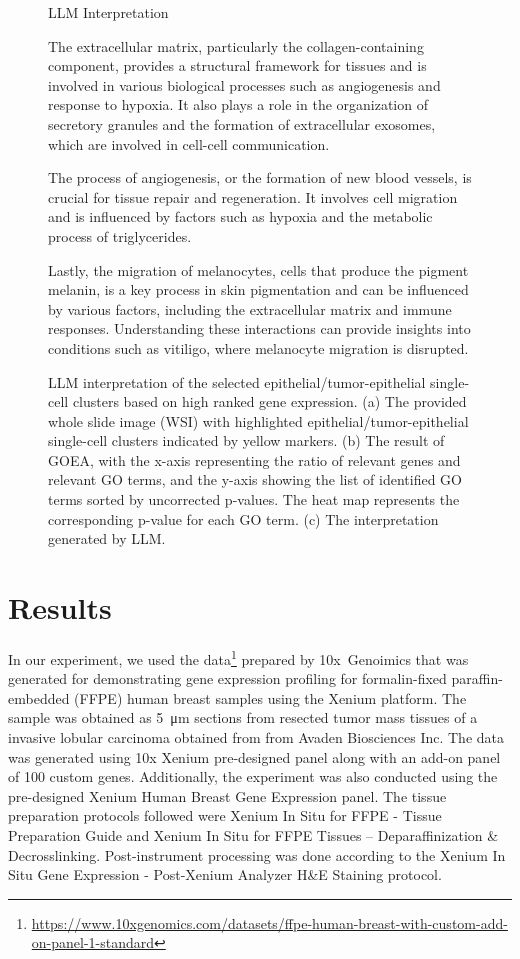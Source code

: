 \documentclass{article}
\begin{document}
\begin{figure}[t]
{\begin{llm}{LLM Interpretation}
{			\hspace{15pt} The extracellular matrix, particularly the collagen-containing component, provides a structural framework for tissues and is involved in various biological processes such as angiogenesis and response to hypoxia. It also plays a role in the organization of secretory granules and the formation of extracellular exosomes, which are involved in cell-cell communication. 
				
			\hspace{15pt} The process of angiogenesis, or the formation of new blood vessels, is crucial for tissue repair and regeneration. It involves cell migration and is influenced by factors such as hypoxia and the metabolic process of triglycerides. 
			
			\hspace{15pt} Lastly, the migration of melanocytes, cells that produce the pigment melanin, is a key process in skin pigmentation and can be influenced by various factors, including the extracellular matrix and immune responses. Understanding these interactions can provide insights into conditions such as vitiligo, where melanocyte migration is disrupted.}%
	\end{llm}}
	\caption{LLM interpretation of the selected epithelial/tumor-epithelial single-cell clusters based on high ranked gene expression. (a) The provided whole slide image (WSI) with highlighted epithelial/tumor-epithelial single-cell clusters indicated by yellow markers. (b) The result of GOEA, with the x-axis representing the ratio of relevant genes and relevant GO terms, and the y-axis showing the list of identified GO terms sorted by uncorrected p-values. The heat map represents the corresponding p-value for each GO term. (c) The interpretation generated by LLM.}
	\label{fig:result2}
\end{figure}

\section{Results}

In our experiment, we used the data\footnote{\url{https://www.10xgenomics.com/datasets/ffpe-human-breast-with-custom-add-on-panel-1-standard}} prepared by 10x~Genoimics that was generated for  demonstrating gene expression profiling for formalin-fixed paraffin-embedded (FFPE) human breast samples using the Xenium platform. The sample was obtained as \si{5\micro\meter} sections from resected tumor mass tissues of a  invasive lobular carcinoma obtained from from Avaden Biosciences Inc. The data was generated using 10x Xenium pre-designed panel along with an add-on panel of 100 custom genes. Additionally, the experiment was also conducted using the pre-designed Xenium Human Breast Gene Expression panel. The tissue preparation protocols followed were Xenium In Situ for FFPE - Tissue Preparation Guide and Xenium In Situ for FFPE Tissues – Deparaffinization \& Decrosslinking. Post-instrument processing was done according to the Xenium In Situ Gene Expression - Post-Xenium Analyzer H\&E Staining protocol.
\end{document}

